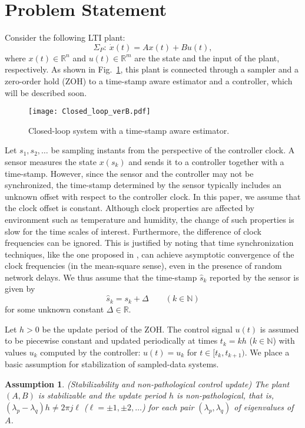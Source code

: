 \documentclass[letterpaper, 12pt, draftcls, onecolumn]{ieeeconf}
\newtheorem{assumption}[theorem]{Assumption}
\begin{document}
\section{Problem Statement}
Consider the following LTI plant:
\begin{equation}
\label{eq:original_plant}
\Sigma_P:~
\dot x(t) = Ax(t) + Bu(t),
\end{equation}
where $x(t) \in \mathbb{R}^n$ and
$u(t) \in \mathbb{R}^m$ are the state and the input of the plant, respectively.
As shown in 
Fig.~\ref{fig:CLS},
this plant is connected 
through a sampler and a zero-order hold (ZOH)
to a time-stamp aware estimator and a controller,
which will be described soon.
\begin{figure}[tb]
	\centering
	\texttt{[image: Closed\_loop\_verB.pdf]}
	\caption{Closed-loop system with a time-stamp aware estimator.}
	\label{fig:CLS}
\end{figure}

Let $s_1,s_2,\dots$ be sampling instants
from the perspective of the controller clock.
A sensor measures the state $x(s_k)$ and sends it to a controller
together with a time-stamp.
However, since the sensor and the controller may not be synchronized,
the time-stamp determined by the sensor 
typically includes an 
unknown offset with respect to the controller clock. 
In this paper, we assume that the clock offset is constant. 
Although
clock properties are affected by environment such as temperature
and humidity,
the change of such properties is slow 
for the time scales of interest.
Furthermore, the difference of 
clock frequencies can be ignored. 
This is justified by noting that 
time synchronization techniques, like the one proposed 
in \cite{He2014},
can achieve asymptotic convergence of the clock frequencies (in the mean-square sense),
even in the presence of random network delays.
We thus assume that
the time-stamp $\hat s_k$ reported by the sensor is given by
\begin{equation}
\label{eq:offset_eq}
\hat s_k = s_k + \Delta \qquad (k \in \mathbb{N})
\end{equation}
for some unknown constant $\Delta \in \mathbb{R}$.

Let $h > 0$ be the update period of the ZOH.
The control signal $u(t)$ 
is assumed to be piecewise constant and updated periodically at times $t_k=k h$ ($k\in \mathbb{N}$) with values $u_k$ computed by the controller:
$u(t) = u_k$ for $t \in [t_k,t_{k+1})$.
We place a basic assumption for stabilization of sampled-data systems.
\begin{assumption}
	\label{ass:stabilizability}
	{\em(}Stabilizability and non-pathological control update{\em)}
	{\em
The plant $(A,B)$ is stabilizable and the update period $h$ is non-pathological,
		that is, $(\lambda_p - \lambda_q) h \not= 2\pi j \ell$ ($\ell = \pm 1, \pm 2,\dots$)
		for each pair $(\lambda_p,\lambda_q)$ of eigenvalues of $A$.
	}
\end{assumption}
\end{document}
